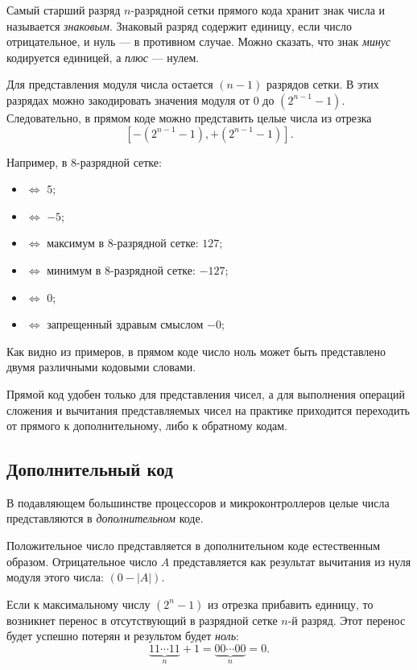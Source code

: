 Самый старший разряд $n$-разрядной сетки прямого кода хранит знак числа и называется \emph{знаковым}. Знаковый разряд содержит единицу, если число отрицательное, и нуль --- в противном случае. Можно сказать, что знак \emph{минус} кодируется единицей, а \emph{плюс} --- нулем.

Для представления модуля числа остается $(n-1)$ разрядов сетки. В этих разрядах можно закодировать значения модуля от $0$ до $(2^{n-1}-1)$. Следовательно, в прямом коде можно представить целые числа из отрезка
\[
    \left[-(2^{n-1}-1), +(2^{n-1}-1)\right].
\]

Например, в $8$-разрядной сетке:
\begin{itemize}
    \item {} $\Leftrightarrow$ $5$;
    \item {} $\Leftrightarrow$ $-5$;
    \item {} $\Leftrightarrow$ максимум в 8-разрядной сетке: $127$;
    \item {} $\Leftrightarrow$ минимум в 8-разрядной сетке: $-127$;
    \item {} $\Leftrightarrow$ $0$;
    \item {} $\Leftrightarrow$ запрещенный здравым смыслом ${-0}$;
\end{itemize}

Как видно из примеров, в прямом коде число ноль может быть представлено двумя различными кодовыми словами. 

Прямой код удобен только для представления чисел, а для выполнения операций сложения и вычитания представляемых чисел на практике приходится переходить от прямого к дополнительному, либо к обратному кодам.


\subsection{Дополнительный код}

В подавляющем большинстве процессоров и микроконтроллеров целые числа представляются в \emph{дополнительном} коде. 

Положительное число представляется в дополнительном коде естественным образом. Отрицательное число $A$ представляется как результат вычитания из нуля модуля этого числа: $(0-|A|)$.

Если к максимальному числу $(2^{n}-1)$ из отрезка прибавить единицу, то возникнет перенос в отсутствующий в разрядной сетке $n$-й разряд. Этот перенос будет успешно потерян и результом будет \emph{ноль}:
\[
    \underbrace{11\cdots 11}_n + 1 = \underbrace{00\cdots 00}_n = 0.
\]
 
